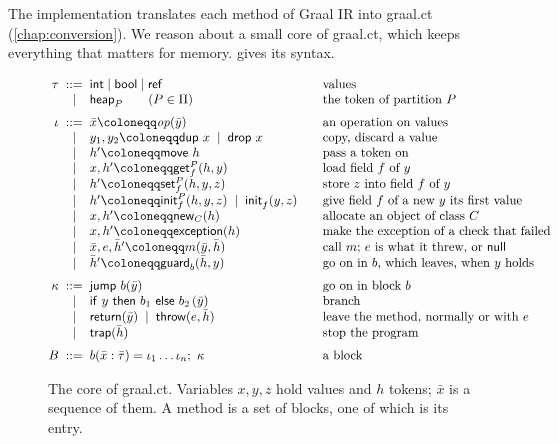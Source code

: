 The implementation translates each method of Graal IR into graal.ct
(\cref{chap:conversion}). We reason about a small core of graal.ct, which keeps
everything that matters for memory.  gives its syntax.

\begin{figure}[t]
\[
\begin{array}{@{}r@{\;\;}c@{\;\;}l@{\qquad}l@{}}
\tau & ::= & \mathsf{int} \mid \mathsf{bool} \mid \mathsf{ref} & \text{values}\\
     & \mid & \Tok{P} \qquad (P \in \Pi) & \text{the token of partition } P\\[6pt]
\iota & ::= & \bar x \coloneqq \mathit{op}(\bar y) & \text{an operation on values}\\
 & \mid & y_1, y_2 \coloneqq \dup\ x \;\mid\; \drop\ x & \text{copy, discard a value}\\
 & \mid & h' \coloneqq \move\ h & \text{pass a token on}\\
 & \mid & x, h' \coloneqq \getf{f}{P}(h, y) & \text{load field } f \text{ of } y\\
 & \mid & h' \coloneqq \setf{f}{P}(h, y, z) & \text{store } z \text{ into field } f \text{ of } y\\
 & \mid & h' \coloneqq \initf{f}{P}(h, y, z) \;\mid\; \initf{f}{}(y, z) & \text{give field } f \text{ of a new } y \text{ its first value}\\
 & \mid & x, h' \coloneqq \newc{C}(h) & \text{allocate an object of class } C\\
 & \mid & x, h' \coloneqq \exn(h) & \text{make the exception of a check that failed}\\
 & \mid & \bar x, e, \bar h' \coloneqq m(\bar y, \bar h) & \text{call } m\text{; } e \text{ is what it threw, or } \nul\\
 & \mid & \bar h' \coloneqq \guard_b(\bar h, y) & \text{go on in } b \text{, which leaves, when } y \text{ holds}\\[6pt]
\kappa & ::= & \jump\ b(\bar y) & \text{go on in block } b\\
 & \mid & \kif{y}{b_1}{b_2}\,(\bar y) & \text{branch}\\
 & \mid & \kret(\bar y) \;\mid\; \kthrow(e, \bar h) & \text{leave the method, normally or with } e\\
 & \mid & \ktrap(\bar h) & \text{stop the program}\\[6pt]
B & ::= & b(\bar x : \bar \tau) = \iota_1 \ldots \iota_n;\ \kappa & \text{a block}
\end{array}
\]
\caption{The core of graal.ct. Variables $x, y, z$ hold values and $h$
tokens; $\bar x$ is a sequence of them. A method is a set of blocks, one of
which is its entry.}
\label{fig:ee-syntax}
\end{figure}

